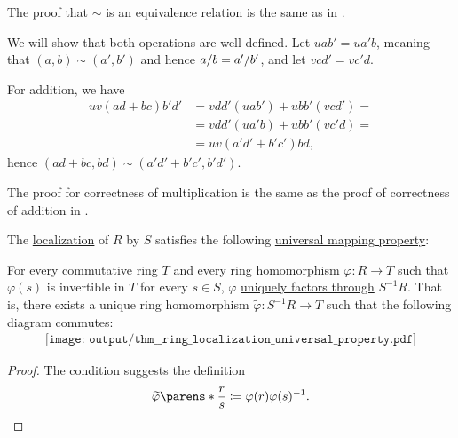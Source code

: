 \begin{defproof}
  The proof that \( {\sim} \) is an equivalence relation is the same as in .

  We will show that both operations are well-defined. Let \( u ab' = u a'b \), meaning that \( (a, b) \sim (a', b') \) and hence \( a / b = a' / b' \), and let \( v cd' = v c'd \).

  For addition, we have
  \begin{align*}
    u v (ad + bc) b' d'
    &=
    v dd' (u ab') + u bb' (v cd')
    = \\ &=
    v dd' (u a'b) + u bb' (v c'd)
    = \\ &=
    u v (a'd' + b'c') b d,
  \end{align*}
  hence \( (ad + bc, bd) \sim (a'd' + b'c', b'd') \).

  The proof for correctness of multiplication is the same as the proof of correctness of addition in .
\end{defproof}

\begin{proposition}\label{thm:ring_localization_universal_property}
  The \hyperref[def:ring_localization]{localization} of \( R \) by \( S \) satisfies the following \hyperref[rem:universal_mapping_property]{universal mapping property}:
  \begin{displayquote}
    For every commutative ring \( T \) and every ring homomorphism \( \varphi: R \to T \) such that \( \varphi(s) \) is invertible in \( T \) for every \( s \in S \), \( \varphi \) \hyperref[def:factors_through]{uniquely factors through} \( S^{-1} R \). That is, there exists a unique ring homomorphism \( \widetilde{\varphi}: S^{-1} R \to T \) such that the following diagram commutes:
    \begin{equation}\label{eq:thm:ring_localization_universal_property/diagram}
      \begin{aligned}
        \texttt{[image: output/thm\_\_ring\_localization\_universal\_property.pdf]}
      \end{aligned}
    \end{equation}
  \end{displayquote}
\end{proposition}
\begin{proof}
  The condition suggests the definition
  \begin{equation*}
    \widetilde{\varphi}\parens*{ \frac r s } \coloneqq \varphi(r) \varphi(s)^{-1}.
  \end{equation*}
\end{proof}


